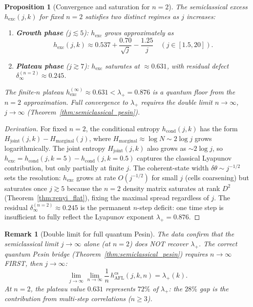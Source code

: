 \documentclass[12pt,a4paper]{article}
\newtheorem{proposition}[theorem]{Proposition}
\newtheorem{remark}[theorem]{Remark}
\begin{document}
\begin{proposition}[Convergence and saturation for $n=2$]
  \label{prop:convergence_rate}
  The semiclassical excess $h_{\mathrm{exc}}(j,k)$ for fixed $n=2$ satisfies
  two distinct regimes as $j$ increases:
  \begin{enumerate}
    \item \textbf{Growth phase} ($j \lesssim 5$): $h_{\mathrm{exc}}$ grows
      approximately as
      \begin{equation}
        \label{eq:convergence_growth}
        h_{\mathrm{exc}}(j,k) \approx 0.537 + \frac{0.70}{\sqrt{j}} - \frac{1.25}{j}
        \quad (j \in [1.5, 20]).
      \end{equation}
    \item \textbf{Plateau phase} ($j \gtrsim 7$): $h_{\mathrm{exc}}$ saturates
      at $\approx 0.631$, with residual defect $\delta_\infty^{(n=2)} \approx 0.245$.
  \end{enumerate}
  The finite-$n$ plateau $h_{\mathrm{exc}}^{(\infty)} \approx 0.631 < \lambda_+ = 0.876$
  is a \emph{quantum floor} from the $n=2$ approximation.  Full convergence to
  $\lambda_+$ requires the double limit $n \to \infty$, $j \to \infty$
  (Theorem~\ref{thm:semiclassical_pesin}).
\end{proposition}
\begin{proof}[Derivation]
  For fixed $n=2$, the conditional entropy $h_{\mathrm{cond}}(j,k)$ has the form
  $H_{\mathrm{joint}}(j,k) - H_{\mathrm{marginal}}(j)$, where
  $H_{\mathrm{marginal}} \approx \log N \sim 2\log j$ grows logarithmically.
  The joint entropy $H_{\mathrm{joint}}(j,k)$ also grows as $\sim 2\log j$, so
  $h_{\mathrm{exc}} = h_{\mathrm{cond}}(j,k=5) - h_{\mathrm{cond}}(j,k=0.5)$
  captures the classical Lyapunov contribution, but only partially at finite $j$.
  The coherent-state width $\delta\theta \sim j^{-1/2}$ sets the resolution:
  $h_{\mathrm{exc}}$ grows at rate $O(j^{-1/2})$ for small $j$ (cells coarsening)
  but saturates once $j \gtrsim 5$ because the $n=2$ density matrix saturates at
  rank $D^2$ (Theorem~\ref{thm:renyi_flat}), fixing the maximal spread regardless of $j$.
  The residual $\delta_\infty^{(n=2)} \approx 0.245$ is the permanent $n$-step deficit:
  one time step is insufficient to fully reflect the Lyapunov exponent
  $\lambda_+ = 0.876$.
\end{proof}

\begin{remark}[Double limit for full quantum Pesin]
  The data confirm that the semiclassical limit $j\to\infty$ alone (at $n=2$) does
  NOT recover $\lambda_+$.  The correct quantum Pesin bridge
  (Theorem~\ref{thm:semiclassical_pesin}) requires $n \to \infty$ FIRST, then $j\to\infty$:
  \[
    \lim_{j\to\infty}\lim_{n\to\infty}
    \frac{1}{n}\,h_{\mathrm{AFL}}^{\mathrm{cs}}(j,k,n) = \lambda_+(k).
  \]
  At $n=2$, the plateau value $0.631$ represents $72\%$ of $\lambda_+$:
  the $28\%$ gap is the contribution from multi-step correlations ($n \geq 3$).
\end{remark}
\end{document}
